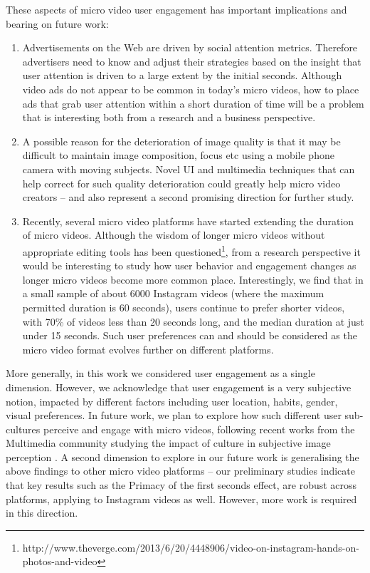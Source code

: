 These aspects of micro video user engagement has important implications and bearing on future work: 
\begin{enumerate}
	\item Advertisements on the Web are driven by social attention metrics. Therefore advertisers need to know and adjust their strategies based on the insight that user attention is driven to a large extent by the initial seconds. Although  video ads do not appear to be common in today's micro videos, how to place ads that grab user attention within a short duration of time will be a problem that is interesting both from a research and a business perspective. 
	\item A possible reason for the deterioration of image quality is that it may be difficult to maintain image composition, focus etc using a mobile phone camera with moving subjects. Novel UI and multimedia techniques that can help correct for such quality deterioration could greatly help micro video creators -- and also represent a second promising direction for further study. 
	\item Recently, several micro video platforms have started extending the duration of micro videos. Although the wisdom of longer micro videos without appropriate editing tools has been questioned\footnote{\scriptsize http://www.theverge.com/2013/6/20/4448906/video-on-instagram-hands-on-photos-and-video}, from a research perspective it would be interesting to study how user behavior and engagement changes as longer micro videos become more common place. Interestingly, we find that in a small sample of about 6000 Instagram videos (where the maximum permitted duration is 60 seconds), users continue to prefer shorter videos, with 70\% of videos less than 20 seconds long, and the median duration at just under 15 seconds. Such user preferences can and should be considered as the micro video format evolves further on different platforms.
	\end{enumerate}

More generally, in this work we considered user engagement as a single dimension. However, we acknowledge that user engagement is a very subjective notion, impacted by different factors including user location, habits, gender, visual preferences. In  future work, we plan to explore how such different user sub-cultures perceive and engage with micro videos, following recent works from the Multimedia community studying the impact of culture in subjective image perception \cite{jou2015visual}. A second dimension to explore in our future work is generalising the above findings to other micro video platforms -- our preliminary studies indicate that key results such as the Primacy of the first seconds effect, are robust across platforms, applying to Instagram videos as well. However, more work is required in this direction.


